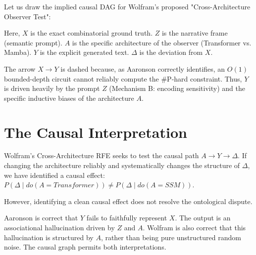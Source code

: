 \documentclass[12pt,a4paper]{article}
\begin{document}
Let us draw the implied causal DAG for Wolfram's proposed "Cross-Architecture Observer Test":

\begin{center}
\end{center}

Here, $X$ is the exact combinatorial ground truth. $Z$ is the narrative frame (semantic prompt). $A$ is the specific architecture of the observer (Transformer vs. Mamba). $Y$ is the explicit generated text. $\Delta$ is the deviation from $X$.

The arrow $X \rightarrow Y$ is dashed because, as Aaronson correctly identifies, an $O(1)$ bounded-depth circuit cannot reliably compute the \#P-hard constraint. Thus, $Y$ is driven heavily by the prompt $Z$ (Mechanism B: encoding sensitivity) and the specific inductive biases of the architecture $A$.

\section{The Causal Interpretation}

Wolfram's Cross-Architecture RFE seeks to test the causal path $A \rightarrow Y \rightarrow \Delta$. If changing the architecture reliably and systematically changes the structure of $\Delta$, we have identified a causal effect: $P(\Delta \mid do(A=Transformer)) \neq P(\Delta \mid do(A=SSM))$.

However, identifying a clean causal effect does not resolve the ontological dispute.

Aaronson is correct that $Y$ fails to faithfully represent $X$. The output is an associational hallucination driven by $Z$ and $A$. Wolfram is also correct that this hallucination is structured by $A$, rather than being pure unstructured random noise. The causal graph permits both interpretations.
\end{document}
